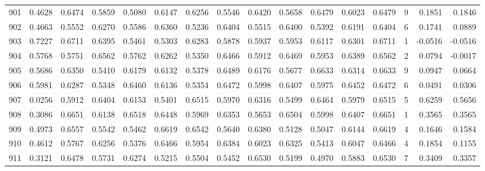 \begin{tabular}{lrrrrrrrrrrrrrrr}
901 &      0.4628 &  0.6474 &  0.5859 &  0.5080 &  0.6147 &  0.6256 &  0.5546 &  0.6420 &  0.5658 &  0.6479 &   0.6023 &     0.6479 &      9 &                    0.1851 &                     0.1846 \\
902 &      0.4663 &  0.5552 &  0.6270 &  0.5586 &  0.6360 &  0.5236 &  0.6404 &  0.5515 &  0.6400 &  0.5392 &   0.6191 &     0.6404 &      6 &                    0.1741 &                     0.0889 \\
903 &      0.7227 &  0.6711 &  0.6395 &  0.5461 &  0.5303 &  0.6283 &  0.5878 &  0.5937 &  0.5953 &  0.6117 &   0.6301 &     0.6711 &      1 &                   -0.0516 &                    -0.0516 \\
904 &      0.5768 &  0.5751 &  0.6562 &  0.5762 &  0.6262 &  0.5350 &  0.6466 &  0.5912 &  0.6469 &  0.5953 &   0.6389 &     0.6562 &      2 &                    0.0794 &                    -0.0017 \\
905 &      0.5686 &  0.6350 &  0.5410 &  0.6179 &  0.6132 &  0.5378 &  0.6489 &  0.6176 &  0.5677 &  0.6633 &   0.6314 &     0.6633 &      9 &                    0.0947 &                     0.0664 \\
906 &      0.5981 &  0.6287 &  0.5348 &  0.6460 &  0.6136 &  0.5354 &  0.6472 &  0.5998 &  0.6407 &  0.5975 &   0.6452 &     0.6472 &      6 &                    0.0491 &                     0.0306 \\
907 &      0.0256 &  0.5912 &  0.6404 &  0.6153 &  0.5401 &  0.6515 &  0.5970 &  0.6316 &  0.5499 &  0.6464 &   0.5979 &     0.6515 &      5 &                    0.6259 &                     0.5656 \\
908 &      0.3086 &  0.6651 &  0.6138 &  0.6518 &  0.6448 &  0.5969 &  0.6353 &  0.5653 &  0.6504 &  0.5998 &   0.6407 &     0.6651 &      1 &                    0.3565 &                     0.3565 \\
909 &      0.4973 &  0.6557 &  0.5542 &  0.5462 &  0.6619 &  0.6542 &  0.5640 &  0.6380 &  0.5128 &  0.5047 &   0.6144 &     0.6619 &      4 &                    0.1646 &                     0.1584 \\
910 &      0.4612 &  0.5767 &  0.6256 &  0.5376 &  0.6466 &  0.5954 &  0.6384 &  0.6023 &  0.6325 &  0.5413 &   0.6047 &     0.6466 &      4 &                    0.1854 &                     0.1155 \\
911 &      0.3121 &  0.6478 &  0.5731 &  0.6274 &  0.5215 &  0.5504 &  0.5452 &  0.6530 &  0.5199 &  0.4970 &   0.5883 &     0.6530 &      7 &                    0.3409 &                     0.3357 \\

\end{tabular}
